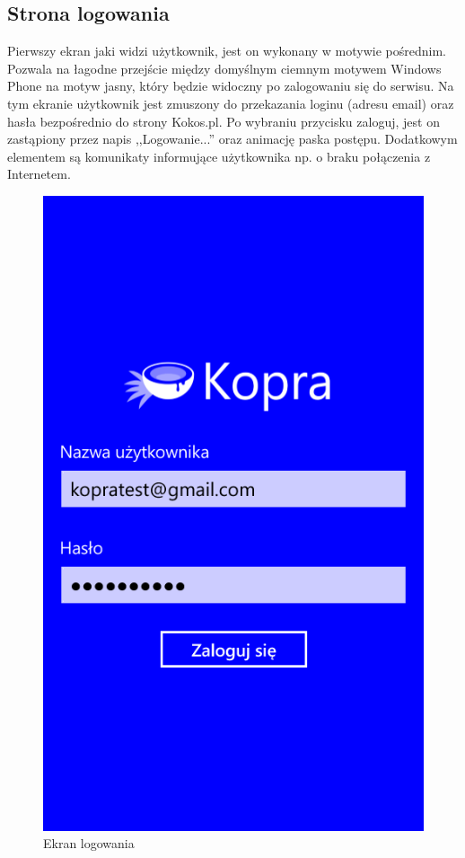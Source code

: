 \documentclass[a4paper,twoside,titlepage,openright]{book}
\begin{document}
\subsection{Strona logowania}
Pierwszy ekran jaki widzi użytkownik, jest on wykonany w motywie pośrednim. Pozwala na łagodne przejście między domyślnym ciemnym motywem Windows Phone na motyw jasny, który będzie widoczny po zalogowaniu się do serwisu. Na tym ekranie użytkownik jest zmuszony do przekazania loginu (adresu email) oraz hasła bezpośrednio do strony Kokos.pl. Po wybraniu przycisku zaloguj, jest on zastąpiony przez napis ,,Logowanie...'' oraz animację paska postępu. Dodatkowym elementem są komunikaty informujące użytkownika np. o braku połączenia z Internetem.
\begin{figure}[htp]
	\centering
	\begin{minipage}[b]{0.3\textwidth}
		\includegraphics[width=\textwidth]{logowanie.png}
		\caption{Ekran logowania}
	\end{minipage}
\hspace*{60px}
	\hfill
\end{figure}
\end{document}
